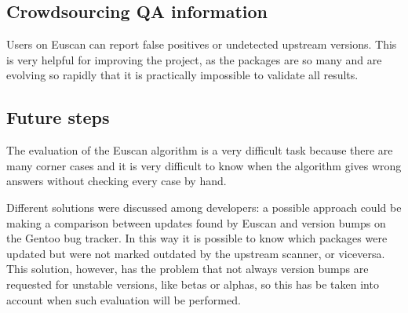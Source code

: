 \subsection{Crowdsourcing QA information}
Users on Euscan can report false positives or undetected upstream versions. This is very helpful for improving the project, as the packages are so many and are evolving so rapidly that it is practically impossible to validate all results.

\subsection{Future steps}
The evaluation of the Euscan algorithm is a very difficult task because there are many corner cases and it is very difficult to know when the algorithm gives wrong answers without checking every case by hand.

Different solutions were discussed among developers: a possible approach could be making a comparison between updates found by Euscan and version bumps on the Gentoo bug tracker. In this way it is possible to know which packages were updated but were not marked outdated by the upstream scanner, or viceversa. This solution, however, has the problem that not always version bumps are requested for unstable versions, like betas or alphas, so this has be taken into account when such evaluation will be performed.